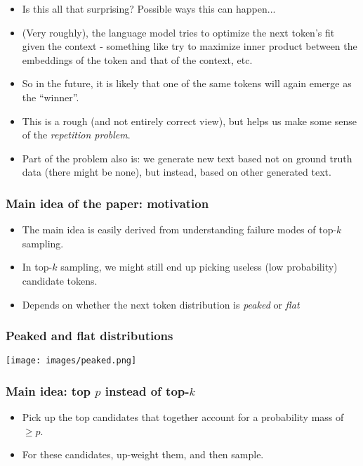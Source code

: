 \documentclass[11pt]{beamer}
\begin{document}
\begin{frame}
  \begin{itemize}
  \item  Is this all that surprising? Possible ways this can happen... \pause
  \item (Very roughly), the language model tries to optimize the next token's fit
  given the context - something like try to maximize inner product between the embeddings of
  the token and that of the context, etc.
  \item   So in the future, it is likely that one of the same tokens will again
    emerge as the ``winner''.
  \item This is a rough (and not entirely correct view), but helps us make some sense of
  the {\em repetition problem}.
  \item Part of the problem also is: we generate new text based not on ground truth
  data (there might be none), but instead, based on other generated text.
  \end{itemize}
\end{frame}

\begin{frame}
  \frametitle{Main idea of the paper: motivation}
  \begin{itemize}
    \item The main idea is easily derived from understanding failure modes of top-$k$ sampling.
\item In top-$k$ sampling, we might still end up picking useless (low probability) candidate tokens.
\item Depends on whether the next token distribution is {\em peaked} or {\em flat}
  \end{itemize}
\end{frame}


\begin{frame}
  \frametitle{Peaked and flat distributions}
\begin{center}
\texttt{[image: images/peaked.png]}
\end{center}
\end{frame}

\begin{frame}
  \frametitle{Main idea: top $p$ instead of top-$k$}
  \begin{itemize}
    \item Pick up the top candidates that together account for a probability mass of $\geqslant p$.
    \item For these candidates, up-weight them, and then sample.
  \end{itemize}
\end{frame}
\end{document}
